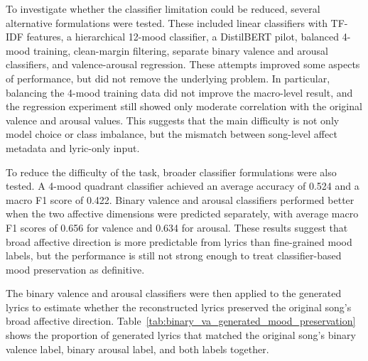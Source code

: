 To investigate whether the classifier limitation could be reduced, several alternative formulations were tested. These included linear classifiers with TF-IDF features, a hierarchical 12-mood classifier, a DistilBERT pilot, balanced 4-mood training, clean-margin filtering, separate binary valence and arousal classifiers, and valence-arousal regression. These attempts improved some aspects of performance, but did not remove the underlying problem. In particular, balancing the 4-mood training data did not improve the macro-level result, and the regression experiment still showed only moderate correlation with the original valence and arousal values. This suggests that the main difficulty is not only model choice or class imbalance, but the mismatch between song-level affect metadata and lyric-only input.

To reduce the difficulty of the task, broader classifier formulations were also tested. A 4-mood quadrant classifier achieved an average accuracy of 0.524 and a macro F1 score of 0.422. Binary valence and arousal classifiers performed better when the two affective dimensions were predicted separately, with average macro F1 scores of 0.656 for valence and 0.634 for arousal. These results suggest that broad affective direction is more predictable from lyrics than fine-grained mood labels, but the performance is still not strong enough to treat classifier-based mood preservation as definitive.

The binary valence and arousal classifiers were then applied to the generated lyrics to estimate whether the reconstructed lyrics preserved the original song's broad affective direction. Table~\ref{tab:binary_va_generated_mood_preservation} shows the proportion of generated lyrics that matched the original song's binary valence label, binary arousal label, and both labels together.

